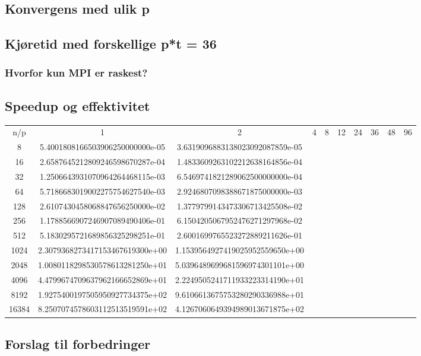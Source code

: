 \documentclass{article}
\begin{document}
\subsection{Konvergens med ulik p}

\subsection{Kjøretid med forskellige p*t = 36}

\subsubsection{Hvorfor kun MPI er raskest?}

\subsection{Speedup og effektivitet}

\begin{table}
\begin{tabular}{c | c c c c c c c c c}

n/p & 1 & 2 & 4 & 8 & 12 & 24 & 36 & 48 & 96 \\
8 &	5.4001808166503906250000000e-05 & 3.6319096883138023092087859e-05 \\
16 &    2.6587645212809246598670287e-04 & 1.4833609263102212638164856e-04 \\
32 &    1.2506643931070964264468115e-03 & 6.5469741821289062500000000e-04 \\
64 &    5.7186683019002275754627540e-03 & 2.9246807098388671875000000e-03 \\
128 &   2.6107430458068847656250000e-02 & 1.3779799143473306713425508e-02 \\
256 &   1.1788566907246907089490406e-01 & 6.1504205067952476271297968e-02 \\
512 &   5.1830295721689856325298251e-01 & 2.6001699765523272889211626e-01 \\
1024 &  2.3079368273417153467619300e+00 & 1.1539564927419025952559650e+00 \\
2048 &  1.0080118298530578613281250e+01 & 5.0396489699681596974301101e+00 \\
4096 &	4.4799674709637962166652869e+01 & 2.2249505241711933223314190e+01 \\
8192 &	1.9275400197505950927734375e+02 & 9.6106613675753280290336988e+01 \\
16384 &	8.2507074578603112513519591e+02 & 4.1267060649394989013671875e+02 \\











\end{tabular}
\end{table}


\subsection{Forslag til forbedringer}
\end{document}
